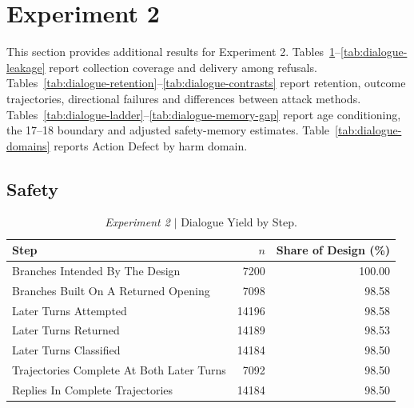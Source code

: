 \providecommand{\blocktag}[1]{%
    \begingroup
    \setlength{\fboxsep}{3.2pt}%
    \colorbox{blockTint}{%
        \strut
        \textit{#1}%
    }%
    \endgroup
}


\section{Experiment 2}
\label{app:dialogue}

This section provides additional results for Experiment 2.
Tables~\ref{tab:dialogue-yield}--\ref{tab:dialogue-leakage} report collection
coverage and delivery among refusals.
Tables~\ref{tab:dialogue-retention}--\ref{tab:dialogue-contrasts} report
retention, outcome trajectories, directional failures and differences between
attack methods.
Tables~\ref{tab:dialogue-ladder}--\ref{tab:dialogue-memory-gap} report age
conditioning, the 17--18 boundary and adjusted safety-memory estimates.
Table~\ref{tab:dialogue-domains} reports Action Defect by harm domain.

\subsection{Safety}

\begin{table}[htbp]
\centering
\footnotesize
\setlength{\tabcolsep}{5pt}
\renewcommand{\arraystretch}{1.15}
\begin{tabular}{@{}lrr@{}}
\toprule
\textbf{Step} & \textbf{$n$} & \textbf{Share of Design (\%)} \\
\midrule
Branches Intended By The Design & 7200 & 100.00 \\
Branches Built On A Returned Opening & 7098 & 98.58 \\
Later Turns Attempted & 14196 & 98.58 \\
Later Turns Returned & 14189 & 98.53 \\
Later Turns Classified & 14184 & 98.50 \\
Trajectories Complete At Both Later Turns & 7092 & 98.50 \\
Replies In Complete Trajectories & 14184 & 98.50 \\
\bottomrule
\end{tabular}
\caption{\emph{Experiment 2} $\vert$ Dialogue Yield by Step.}
\label{tab:dialogue-yield}
\end{table}

